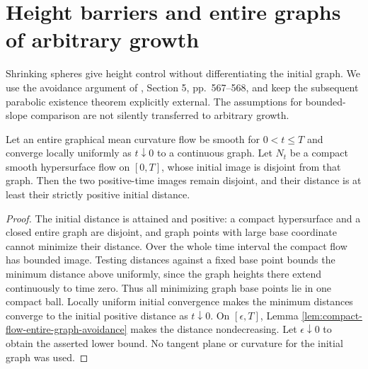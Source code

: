 \chapter{Height barriers and entire graphs of arbitrary growth}\label{sec:graphical-height-existence}
Shrinking spheres give height control without differentiating the initial graph. We use the avoidance argument of \cite{EH91}, Section 5, pp.~567--568, and keep the subsequent parabolic existence theorem explicitly external. The assumptions for bounded-slope comparison are not silently transferred to arbitrary growth.

\begin{lemma}\label{lem:entire-graph-initial-trace-avoidance}
Let an entire graphical mean curvature flow be smooth for $0<t\leq T$ and converge locally uniformly as $t\downarrow0$ to a continuous graph. Let $N_t$ be a compact smooth hypersurface flow on $[0,T]$, whose initial image is disjoint from that graph. Then the two positive-time images remain disjoint, and their distance is at least their strictly positive initial distance.
\end{lemma}
\begin{proof}
The initial distance is attained and positive: a compact hypersurface and a closed entire graph are disjoint, and graph points with large base coordinate cannot minimize their distance. Over the whole time interval the compact flow has bounded image. Testing distances against a fixed base point bounds the minimum distance above uniformly, since the graph heights there extend continuously to time zero. Thus all minimizing graph base points lie in one compact ball. Locally uniform initial convergence makes the minimum distances converge to the initial positive distance as $t\downarrow0$. On $[\epsilon,T]$, Lemma \ref{lem:compact-flow-entire-graph-avoidance} makes the distance nondecreasing. Let $\epsilon\downarrow0$ to obtain the asserted lower bound. No tangent plane or curvature for the initial graph was used.
\end{proof}

